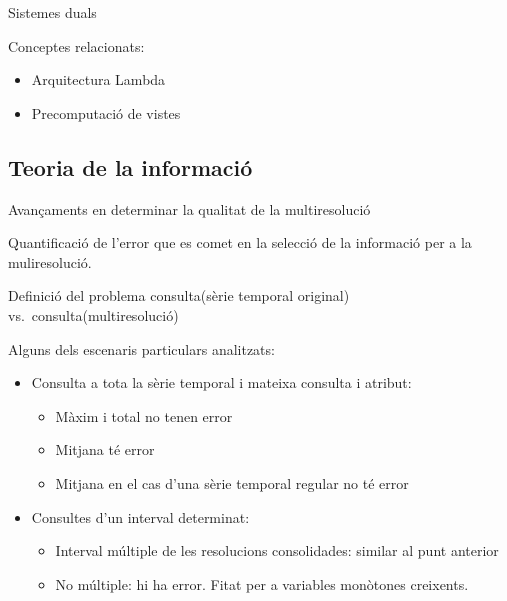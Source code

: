 \begin{frame}{Sistemes duals}

Conceptes relacionats: 
\begin{itemize}
\item Arquitectura Lambda \parencite{marz14:bigdata} 
\item Precomputació de vistes \parencite{date04:introduction8}
\end{itemize}





\end{frame}




\subsection*{Teoria de la informació}
\begin{frame}{Avançaments en determinar la qualitat de la multiresolució}

  Quantificació de l'error que es comet en la selecció de la informació
  per a la muliresolució. 

\begin{block}{Definició del problema}
\centering
consulta(sèrie temporal original) vs.\ consulta(multiresolució)
\end{block}


Alguns dels escenaris particulars analitzats:
\begin{itemize}
\item Consulta a tota la sèrie temporal i mateixa consulta i atribut:
  \begin{itemize}
  \item Màxim i total no tenen error
  \item Mitjana té error
  \item Mitjana en el cas d'una sèrie temporal regular no té error 
  \end{itemize}

\item Consultes d'un interval determinat:
  \begin{itemize}
  \item Interval múltiple de les resolucions consolidades: similar al punt anterior
  \item No múltiple: hi ha error. Fitat per a variables monòtones creixents.
  \end{itemize}



\end{itemize}

\end{frame}




